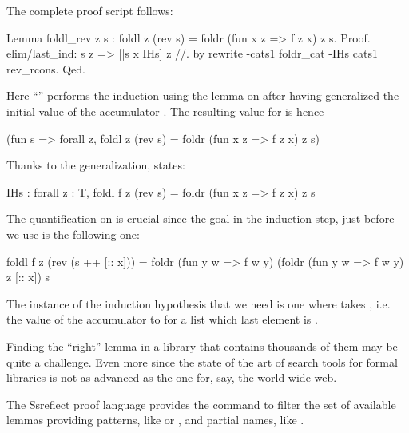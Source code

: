 The complete proof script follows:

\begin{coq}{}{}
Lemma foldl_rev z s : foldl z (rev s) = foldr (fun x z => f z x) z s.
Proof.
elim/last_ind: s z => [|s x IHs] z //.
by rewrite -cats1 foldr_cat -IHs cats1 rev_rcons.
Qed.
\end{coq}

Here ``'' performs the induction using the
 lemma on  after having generalized the initial value of
the accumulator .  The resulting value for  is hence

\begin{coq}{}{}
(fun s => forall z, foldl z (rev s) = foldr (fun x z => f z x) z s)
\end{coq}

Thanks to the generalization,  states:

\begin{coq}{}{}
IHs : forall z : T, foldl f z (rev s) = foldr (fun x z => f z x) z s
\end{coq}
The quantification on  is crucial since the goal in the induction step,
just before we use  is the following one:

\begin{coqout}{}{}
foldl f z (rev (s ++ [:: x])) =
  foldr (fun y w => f w y) (foldr (fun y w => f w y) z [:: x]) s
\end{coqout}

The instance of the induction hypothesis that we need is
one where  takes ,
i.e. the value of the accumulator to  for a list
which last element is .

\label{sec:search}

Finding the ``right'' lemma in a library that contains thousands of them may be
quite a challenge.  Even more since the state of the art of search tools for
formal libraries is not as advanced as the one for, say, the world wide web.

The Ssreflect proof language provides the  command to
filter the set of available lemmas providing patterns, like \C{(_ * _ + )}
or , and partial names, like .


